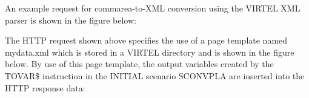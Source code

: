 \documentclass[letterpaper,10pt,english]{sphinxmanual}
\begin{document}

An example request for commarea-to-XML conversion using the VIRTEL XML parser is shown in the figure below:

\begin{sphinxVerbatim}[commandchars=\\\{\}]
  
 
 
 
 
\end{sphinxVerbatim}


The HTTP request shown above specifies the use of a page template named mydata.xml which is stored in a VIRTEL
directory and is shown in the figure below. By use of this page template, the output variables created by the TOVAR\$
instruction in the INITIAL scenario SCONVPLA are inserted into the HTTP response data:
\end{document}
